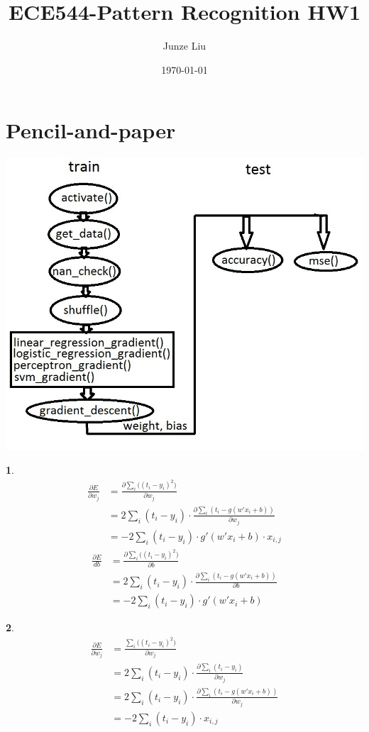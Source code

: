 \documentclass{article}
\title{ECE544-Pattern Recognition HW1}
\author{Junze Liu}
\date{\today}
\begin{document}
\maketitle
\section{Pencil-and-paper}

\includegraphics[width = .6\textwidth]{dependencyTree.jpg}


\textbf1.\\
\[\begin{aligned}
\frac{\partial E}{\partial w_j} &= \frac{\partial\sum_{i}\big((t_i-y_i)^2)}{\partial w_j}\\
&=2\sum_i(t_i-y_i)\cdot \frac{\partial\sum_i(t_i-g(w'x_i+b))}{\partial w_j}\\
&=-2\sum_i(t_i-y_i)\cdot g'(w'x_i+b)\cdot x_{i, j}
\end{aligned}\]
\[\begin{aligned}
\frac{\partial E}{db} &= \frac{\partial\sum_{i}\big((t_i-y_i)^2)}{\partial b}\\
&=2\sum_i(t_i-y_i)\cdot \frac{\partial\sum_i(t_i-g(w'x_i+b))}{\partial b}\\
&=-2\sum_i(t_i-y_i) \cdot g'(w'x_i+b) 
\end{aligned}
\]

\textbf2.\\
\[\begin{aligned}
\frac{\partial E}{\partial w_j}&=\frac{\sum_{i}\big((t_i-y_i)^2)}{\partial w_j}\\
&=2\sum_i(t_i-y_i)\cdot \frac{\partial\sum_i(t_i-y_i)}{\partial w_j}\\
&=2\sum_i(t_i-y_i)\cdot \frac{\partial\sum_i(t_i-g(w'x_i+b))}{\partial w_j}\\
&=-2\sum_i(t_i-y_i)\cdot x_{i, j}
\end{aligned}
\]
\end{document}
